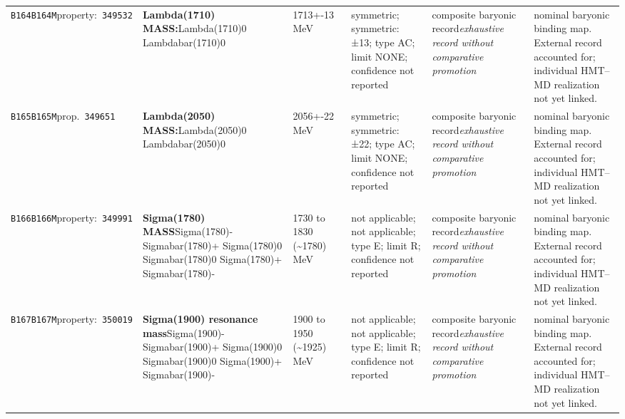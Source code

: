 \begin{landscape}
\begin{longtable}{L{1.85cm}L{4.45cm}L{2.35cm}L{4.05cm}L{3.35cm}L{7.15cm}}
\texttt{B164}\newline \texttt{B164M}\newline property:\ \texttt{349532} & \textbf{Lambda(1710) MASS:}\newline Lambda(1710)0 \textbar{}\allowbreak{} Lambdabar(1710)0 & 1713+-13\,MeV & symmetric; symmetric: ±13; type AC; limit NONE; confidence not reported & composite baryonic record\newline \emph{exhaustive record without comparative promotion} & nominal baryonic binding map. External record accounted for; individual HMT--MD realization not yet linked. \\
\texttt{B165}\newline \texttt{B165M}\newline prop.\ \texttt{349651} & \textbf{Lambda(2050) MASS:}\newline Lambda(2050)0 \textbar{}\allowbreak{} Lambdabar(2050)0 & 2056+-22\,MeV & symmetric; symmetric: ±22; type AC; limit NONE; confidence not reported & composite baryonic record\newline \emph{exhaustive record without comparative promotion} & nominal baryonic binding map. External record accounted for; individual HMT--MD realization not yet linked. \\
\texttt{B166}\newline \texttt{B166M}\newline property:\ \texttt{349991} & \textbf{Sigma(1780) MASS}\newline Sigma(1780)- \textbar{}\allowbreak{} Sigmabar(1780)+ \textbar{}\allowbreak{} Sigma(1780)0 \textbar{}\allowbreak{} Sigmabar(1780)0 \textbar{}\allowbreak{} Sigma(1780)+ \textbar{}\allowbreak{} Sigmabar(1780)- & 1730 to 1830 (\textasciitilde{}1780)\,MeV & not applicable; not applicable; type E; limit R; confidence not reported & composite baryonic record\newline \emph{exhaustive record without comparative promotion} & nominal baryonic binding map. External record accounted for; individual HMT--MD realization not yet linked. \\
\texttt{B167}\newline \texttt{B167M}\newline property:\ \texttt{350019} & \textbf{Sigma(1900) resonance mass}\newline Sigma(1900)- \textbar{}\allowbreak{} Sigmabar(1900)+ \textbar{}\allowbreak{} Sigma(1900)0 \textbar{}\allowbreak{} Sigmabar(1900)0 \textbar{}\allowbreak{} Sigma(1900)+ \textbar{}\allowbreak{} Sigmabar(1900)- & 1900 to 1950 (\textasciitilde{}1925)\,MeV & not applicable; not applicable; type E; limit R; confidence not reported & composite baryonic record\newline \emph{exhaustive record without comparative promotion} & nominal baryonic binding map. External record accounted for; individual HMT--MD realization not yet linked. \\

\end{longtable}
\end{landscape}
